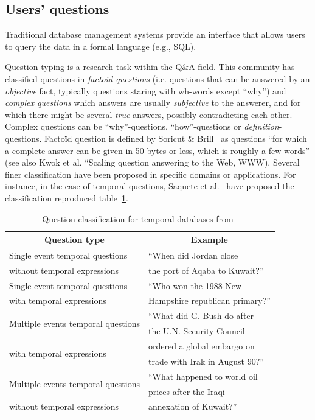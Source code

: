\documentclass[10pt,journal,letterpaper,compsoc]{IEEEtran}
\newcommand\TODO[1]{{\textcolor{red}{TODO:#1\\}}}
\begin{document}
\subsection{Users' questions}

\label{sec:big-picture-question}
Traditional database management systems provide an interface that allows users
to query the data in a formal language (e.g., SQL).

Question typing is a research task within the Q\&A field.
This community has classified questions in \emph{facto\"id questions} (i.e.
questions that can be answered by an \emph{objective} fact, typically questions
staring with wh-words except ``why'') and \emph{complex questions} which
answers are usually \emph{subjective} to the answerer, and for which there
might be several \emph{true} answers, possibly contradicting each other.
Complex questions can be ``why''-questions, ``how''-questions or
\emph{definition}-questions.
Facto\"id question is defined by Soricut \&
Brill~\cite{Soricut:2006:AQA:1127331.1127342} as questions ``for which a
complete answer can be given in 50 bytes or less, which is roughly a few
words'' (see also Kwok et al. ``Scaling question answering to the Web, WWW).
Several finer classification have been proposed in specific domains or
applications. 
For instance, in the case of temporal questions, Saquete et
al.~\cite{Saquete:2004:SCT:1218955.1219027} have proposed the classification
reproduced table~\ref{tab:saquete-classification}.
\begin{table}
\centering
\begin{tabular}{ll}\hline
\multicolumn{1}{c}{\textbf{Question type}} &
\multicolumn{1}{c}{\textbf{Example}}\\\hline\hline
Single event temporal questions &
``When did Jordan close \\
 without temporal expressions & the port of Aqaba to Kuwait?''\\\hline 
 Single event temporal questions & 
``Who won the 1988 New \\
 with temporal expressions & Hampshire republican primary?''\\\hline
 \multirow{2}{*}{Multiple events temporal questions} & ``What did G. Bush do
 after\\
  & the U.N. Security Council\\
 \multirow{2}{*}{with temporal expressions} & ordered a global embargo on\\
  & trade with Irak in August 90?''\\\hline
  \multirow{2}{*}{Multiple events temporal questions} & ``What happened to world
  oil\\
   & prices after the Iraqi\\
  without temporal expressions & annexation of Kuwait?''\\\hline
 
\end{tabular}
\caption{Question classification for temporal databases from~\cite{Saquete:2004:SCT:1218955.1219027}}
\label{tab:saquete-classification}
\end{table}
\end{document}
